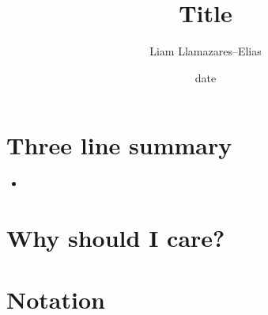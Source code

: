 \documentclass[12pt]{article}
\begin{document}
\title{Title}
\author{Liam Llamazares--Elias}
\date{date}
\maketitle
\section{ Three line summary}
\begin{itemize}
	\item
\end{itemize}
\section{Why should I care?}

\section{Notation}
\end{document}
